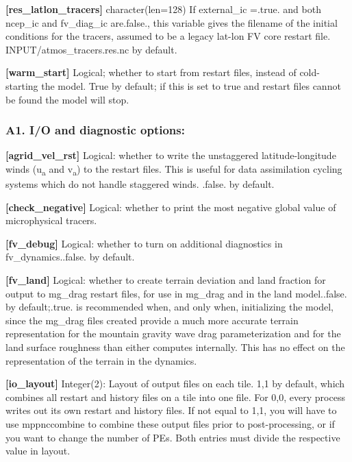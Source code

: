 {\bfseries \mbox{[}res\+\_\+latlon\+\_\+tracers\mbox{]}} character(len=128) If external\+\_\+ic =.true. and both ncep\+\_\+ic and fv\+\_\+diag\+\_\+ic are.\+false., this variable gives the filename of the initial conditions for the tracers, assumed to be a legacy lat-\/lon FV core restart file. I\+N\+P\+U\+T/atmos\+\_\+tracers.\+res.\+nc by default.

{\bfseries \mbox{[}warm\+\_\+start\mbox{]}} Logical; whether to start from restart files, instead of cold-\/starting the model. True by default; if this is set to true and restart files cannot be found the model will stop.

\subsubsection*{A1. I/O and diagnostic options\+:}

{\bfseries \mbox{[}agrid\+\_\+vel\+\_\+rst\mbox{]}} Logical\+: whether to write the unstaggered latitude-\/longitude winds (u\textsubscript{a} and v\textsubscript{a}) to the restart files. This is useful for data assimilation cycling systems which do not handle staggered winds. .false. by default.

{\bfseries \mbox{[}check\+\_\+negative\mbox{]}} Logical\+: whether to print the most negative global value of microphysical tracers.

{\bfseries \mbox{[}fv\+\_\+debug\mbox{]}} Logical\+: whether to turn on additional diagnostics in fv\+\_\+dynamics..false. by default.

{\bfseries \mbox{[}fv\+\_\+land\mbox{]}} Logical\+: whether to create terrain deviation and land fraction for output to mg\+\_\+drag restart files, for use in mg\+\_\+drag and in the land model..false. by default;.true. is recommended when, and only when, initializing the model, since the mg\+\_\+drag files created provide a much more accurate terrain representation for the mountain gravity wave drag parameterization and for the land surface roughness than either computes internally. This has no effect on the representation of the terrain in the dynamics.

{\bfseries \mbox{[}io\+\_\+layout\mbox{]}} Integer(2)\+: Layout of output files on each tile. 1,1 by default, which combines all restart and history files on a tile into one file. For 0,0, every process writes out its own restart and history files. If not equal to 1,1, you will have to use mppnccombine to combine these output files prior to post-\/processing, or if you want to change the number of P\+Es. Both entries must divide the respective value in layout.

